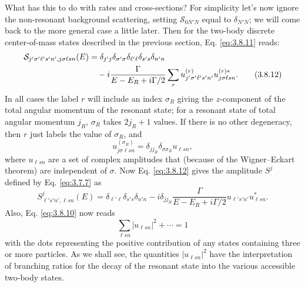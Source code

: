 What has this to do with rates and cross-sections? For simplicity let's now
ignore the non-resonant background scattering, setting
$\mathcal S_{0N'N}$ equal to $\delta_{N'N}$; we will come back to the more
general case a little later. Then for the two-body discrete center-of-mass
states described in the previous section, Eq. \eqref{eq:3.8.11} reads:
\begin{align}
  \mathcal S_{j'\sigma'\ell's'n',j\sigma\ell sn}(E)
  &=\delta_{j'j}\delta_{\sigma'\sigma}\delta_{\ell'\ell}
    \delta_{s's}\delta_{n'n} \notag\\
  &\quad-i\frac{\Gamma}{E-E_R+i\Gamma/2}
    \sum_r u_{j'\sigma'\ell's'n'}^{(r)}
           u_{j\sigma\ell sn}^{(r)*}.
  \tag{3.8.12}\label{eq:3.8.12}
\end{align}
In all cases the label $r$ will include an index $\sigma_R$ giving the
$z$-component of the total angular momentum of the resonant state; for a
resonant state of total angular momentum $j_R$, $\sigma_R$ takes $2j_R+1$
values. If there is no other degeneracy, then $r$ just labels the value of
$\sigma_R$, and
\begin{equation}
  u_{j\sigma\ell sn}^{(\sigma_R)}
  =\delta_{jj_R}\delta_{\sigma\sigma_R}u_{\ell sn},
  \tag{3.8.13}\label{eq:3.8.13}
\end{equation}
where $u_{\ell sn}$ are a set of complex amplitudes that (because of the
Wigner--Eckart theorem) are independent of $\sigma$. Now Eq. \eqref{eq:3.8.12} gives
the amplitude $S^j$ defined by Eq. \eqref{eq:3.7.7} as
\begin{equation}
  S^j_{\ell's'n',\ell sn}(E)
  =\delta_{\ell'\ell}\delta_{s's}\delta_{n'n}
  -i\delta_{jj_R}\frac{\Gamma}{E-E_R+i\Gamma/2}
   u_{\ell's'n'}u_{\ell sn}^*.
  \tag{3.8.14}\label{eq:3.8.14}
\end{equation}
Also, Eq. \eqref{eq:3.8.10} now reads
\begin{equation}
  \sum_{\ell sn}|u_{\ell sn}|^2+\cdots=1
  \tag{3.8.15}\label{eq:3.8.15}
\end{equation}
with the dots representing the positive contribution of any states containing
three or more particles. As we shall see, the quantities $|u_{\ell sn}|^2$
have the interpretation of branching ratios for the decay of the resonant
state into the various accessible two-body states.

